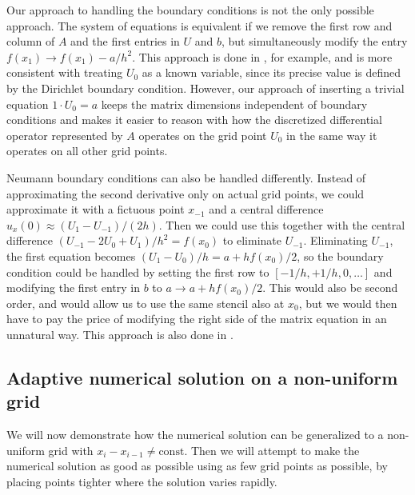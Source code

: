 Our approach to handling the boundary conditions is not the only possible approach.
The system of equations is equivalent if we remove the first row and column of $A$ and the first entries in $U$ and $b$, but simultaneously modify the entry $f(x_1) \rightarrow f(x_1) - a/h^2$.
This approach is done in \cite{owren}, for example, and is more consistent with treating $U_0$ as a known variable, since its precise value is defined by the Dirichlet boundary condition.
However, our approach of inserting a trivial equation $1 \cdot U_0 = a$ keeps the matrix dimensions independent of boundary conditions and makes it easier to reason with how the discretized differential operator represented by $A$ operates on the grid point $U_0$ in the same way it operates on all other grid points.

Neumann boundary conditions can also be handled differently.
Instead of approximating the second derivative only on actual grid points, we could approximate it with a fictuous point $x_{-1}$ and a central difference $u_x(0) \approx (U_1 - U_{-1}) / (2 h)$.
Then we could use this together with the central difference $(U_{-1} - 2 U_0 + U_1) / h^2 = f(x_0)$ to eliminate $U_{-1}$.
Eliminating $U_{-1}$, the first equation becomes $(U_1 - U_0) / h = a + h f(x_0) / 2$, so the boundary condition could be handled by setting the first row to $[-1/h, +1/h, 0, \dots]$ and modifying the first entry in $b$ to $a \rightarrow a + h f(x_0) / 2$.
This would also be second order, and would allow us to use the same stencil also at $x_0$, but we would then have to pay the price of modifying the right side of the matrix equation in an unnatural way.
This approach is also done in \cite{owren}.




\subsection{Adaptive numerical solution on a non-uniform grid}

\label{ex1_amr_section}

We will now demonstrate how the numerical solution can be generalized to a non-uniform grid with $x_i - x_{i-1} \neq \text{const}$.
Then we will attempt to make the numerical solution as good as possible using as few grid points as possible, by placing points tighter where the solution varies rapidly.

